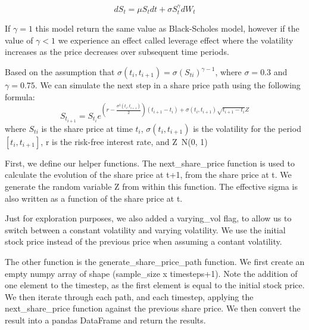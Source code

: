 \documentclass[11pt]{article}
\begin{document}
\[dS_t =  \mu S_t dt + \sigma  S^\gamma _t dW_t\]

If $\gamma = 1$ this model return the same value as Black-Scholes model, however if the value of $\gamma < 1 $ we experience an effect called leverage effect where the volatility increases as the price decreases over subsequent time periods.

Based on the assumption that $\sigma(t_i,t_{i+1}) = \sigma(S_{ti})^{\gamma-1}$, where $\sigma = 0.3$ and $\gamma = 0.75$.  We can simulate the next step in a share price path using the following formula:
$$S_{t_{i+1}} = S_{t_i}e^{(r - \frac{\sigma^2 (t_i,t_{i+1})}{2})(t_{i+1}-t_i)+\sigma(t_i, t_{i+1})\sqrt{t_{i+1}-t_i}Z}$$
where $S_{ti}$ is the share price at time $t_i$, $\sigma(t_i, t_{i+1})$ is the volatility for the period $[t_i,t_{i+1}]$, r is the risk-free interest rate, and Z~N(0, 1)

First, we define our helper functions. The next\_share\_price function
is used to calculate the evolution of the share price at t+1, from the
share price at t. We generate the random variable Z from within this
function. The effective sigma is also written as a function of the share
price at t.

Just for exploration purposes, we also added a varying\_vol flag, to
allow us to switch between a constant volatility and varying volatility.
We use the initial stock price instead of the previous price when
assuming a contant volatility.

The other function is the generate\_share\_price\_path function. We
first create an empty numpy array of shape (sample\_size x timesteps+1).
Note the addition of one element to the timestep, as the first element
is equal to the initial stock price. We then iterate through each path,
and each timestep, applying the next\_share\_price function against the
previous share price. We then convert the result into a pandas DataFrame
and return the results.
\end{document}
